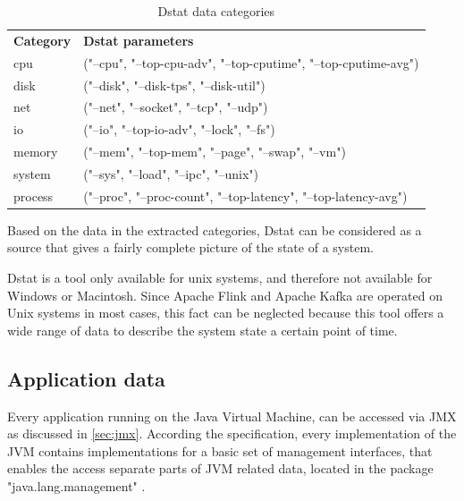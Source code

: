 \begin{table}[H]
    \begin{tabular}{ll}
        \textbf{Category} & \textbf{Dstat parameters} \\
        cpu & ("--cpu", "--top-cpu-adv", "--top-cputime", "--top-cputime-avg")\\
        disk & ("--disk", "--disk-tps", "--disk-util")\\
        net & ("--net", "--socket", "--tcp", "--udp")\\
        io & ("--io", "--top-io-adv", "--lock", "--fs")\\
        memory & ("--mem", "--top-mem", "--page", "--swap", "--vm")\\
        system & ("--sys", "--load", "--ipc", "--unix")\\
        process & ("--proc", "--proc-count", "--top-latency", "--top-latency-avg")\\
    \end{tabular}
    \caption{Dstat data categories}
    \label{tbl:dstatcategories}
\end{table}

Based on the data in the extracted categories, Dstat can be considered
as a source that gives a fairly complete picture of the state of a system.

Dstat is a tool only available for unix systems, and therefore not available for Windows or
Macintosh. Since Apache Flink and Apache Kafka are operated on Unix systems in most
cases, this fact can be neglected because this tool offers a wide range of data to describe
the system state a certain point of time.

\subsection{Application data}

Every application running on the Java Virtual Machine, can be accessed via JMX as discussed
in \autoref{sec:jmx}. According the specification, every implementation of the JVM contains
implementations for a basic set of management interfaces, that enables the access separate parts of JVM related data,
located in the package "java.lang.management" \cite{Javadoc16}.

